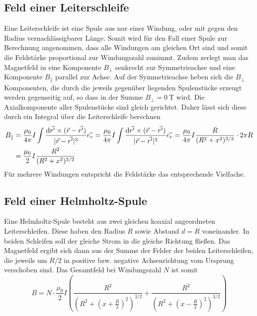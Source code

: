 \subsection{Feld einer Leiterschleife}
Eine Leiterschleife ist eine Spule aus nur einer Windung, oder mit gegen den Radius vernachlässigbarer Länge. Somit wird für den Fall einer Spule zur Berechnung angenommen, dass alle Windungen am gleichen Ort sind und somit die Feldstärke proportional zur Windungszahl zunimmt. Zudem zerlegt man das Magnetfeld in eine Komponente $ B_\perp $ senkrecht zur Symmetrieachse und eine Komponente $ B_\parallel $ parallel zur Achse. Auf der Symmetrieachse heben sich die $ B_\perp $ Komponenten, die durch die jeweils gegenüber liegenden Spulenstücke erzeugt werden gegenseitig auf, so dass in der Summe $ B_\perp = \SI{0}{\tesla} $ wird. Die Axialkomponente aller Spulenstücke sind gleich gerichtet. Daher lässt sich diese durch ein Integral über die Leiterschleife berechnen
\begin{align}
 	B_\parallel &= \frac{\mu_0}{4\pi} I \int \frac{\mathrm{d}\vec{r'}\times (\vec{r} - \vec{r'})}{|\vec{r} - \vec{r'}|^3} \vec{e_r} = \frac{\mu_0}{4\pi} I \int \frac{\mathrm{d}\vec{r'}\times (\vec{r} - \vec{r'})}{|\vec{r} - \vec{r'}|^3} \vec{e_r}
 	 = \frac{\mu_0}{4\pi} I \frac{R}{(R^2 + x^2)^{3/2}} \cdot 2\pi R \notag \\
 	&= \frac{\mu_0}{2}I \frac{R^2}{(R^2 + x^2)^{3/2}}
\end{align}
Für mehrere Windungen entspricht die Feldstärke das entsprechende Vielfache.

\subsection{Feld einer Helmholtz-Spule}
Eine Helmholtz-Spule besteht aus zwei gleichen koaxial angeordneten Leiterschleifen. Diese haben den Radius $ R $ sowie Abstand $ d = R $ voneinander. In beiden Schleifen soll der gleiche Strom in die gleiche Richtung fließen. Das Magnetfeld ergibt sich dann aus der Summe der Felder der beiden Leiterschleifen, die jeweils um $ R/2 $ in positive bzw. negative Achsenrichtung vom Ursprung verschoben sind. Das Gesamtfeld bei Windungszahl $ N $ ist somit
\begin{equation}
	B = N\cdot \frac{\mu_0}{2} I \left(\frac{R^2}{\left(R^2 + \left(x + \frac{R}{2}\right)^2\right)^{3/2}} + \frac{R^2}{\left(R^2 + \left(x - \frac{R}{2}\right)^2\right)^{3/2}}\right)
\end{equation}

